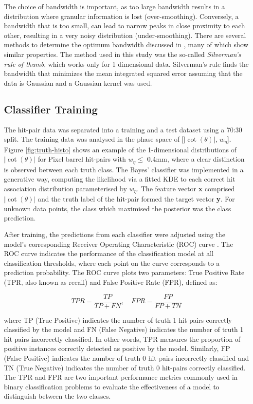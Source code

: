 The choice of bandwidth is important, as too large bandwidth results in a distribution where granular information is lost (over-smoothing). Conversely, a bandwidth that is too small, can lead to narrow peaks in close proximity to each other, resulting in a very noisy distribution (under-smoothing). There are several methods to determine the optimum bandwidth discussed in \cite{bandwidth-selection-methods}, many of which show similar properties. The method used in this study was the so-called \textit{Silverman's rule of thumb}, which works only for 1-dimensional data. Silverman's rule finds the bandwidth that minimizes the mean integrated squared error assuming that the data is Gaussian and a Gaussian kernel was used.

\newpage
\subsection{Classifier Training}

The hit-pair data was separated into a training and a test dataset using a 70:30 split. The training data was analysed in the phase space of [$|\cot(\theta)|$, $w_{\eta}$]. Figure \ref{fig:truth-histo} shows an example of the 1-dimensional distributions of $|\cot(\theta)|$ for Pixel barrel hit-pairs with $w_{\eta} \le$ 0.4mm, where a clear distinction is observed between each truth class. The Bayes’ classifier was implemented in a generative way, computing the likelihood via a fitted KDE to each correct hit association distribution parameterised by $w_{\eta}$. The feature vector \textbf{x} comprised $|\cot(\theta)|$ and the truth label of the hit-pair formed the target vector \textbf{y}. For unknown data points, the class which maximised the posterior was the class prediction.

After training, the predictions from each classifier were adjusted using the model's corresponding Receiver Operating Characteristic (ROC) curve \cite{Davis2006-oh}. The ROC curve indicates the performance of the classification model at all classification thresholds, where each point on the curve corresponds to a prediction probability. The ROC curve plots two parameters: True Positive Rate (TPR, also known as recall) and False Positive Rate (FPR), defined as:  

\begin{equation}
    TPR = \frac{TP}{TP + FN}, \quad FPR = \frac{FP}{FP + TN}
\end{equation}

where TP (True Positive) indicates the number of truth 1 hit-pairs correctly classified by the model and FN (False Negative) indicates the number of truth 1 hit-pairs incorrectly classified. In other words, TPR measures the proportion of positive instances correctly detected as positive by the model. Similarly, FP (False Positive) indicates the number of truth 0 hit-pairs incorrectly classified and TN (True Negative) indicates the number of truth 0 hit-pairs correctly classified. The TPR and FPR are two important performance metrics commonly used in binary classification problems to evaluate the effectiveness of a model to distinguish between the two classes. 

